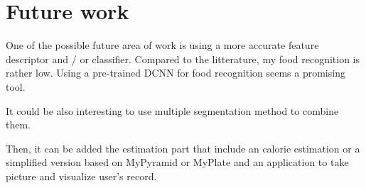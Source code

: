 \chapter{Future work} \label{sec:conclusion}

One of the possible future area of work is using a more accurate feature descriptor and / or classifier. Compared to the litterature, my food recognition is rather low. Using a pre-trained DCNN for food recognition seems a promising tool.

It could be also interesting to use multiple segmentation method to combine them.

Then, it can be added the estimation part that include an calorie estimation or a simplified version based on MyPyramid or MyPlate and an application to take picture and visualize user's record.